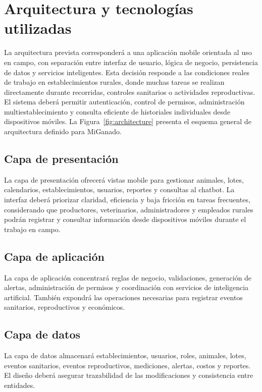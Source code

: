 \section{Arquitectura y tecnolog\'ias utilizadas}

La arquitectura prevista corresponder\'a a una aplicaci\'on mobile orientada al uso en campo, con separaci\'on entre interfaz de usuario, l\'ogica de negocio, persistencia de datos y servicios inteligentes. Esta decisi\'on responde a las condiciones reales de trabajo en establecimientos rurales, donde muchas tareas se realizan directamente durante recorridas, controles sanitarios o actividades reproductivas. El sistema deber\'a permitir autenticaci\'on, control de permisos, administraci\'on multiestablecimiento y consulta eficiente de historiales individuales desde dispositivos m\'oviles. La Figura~\ref{fig:architecture} presenta el esquema general de arquitectura definido para MiGanado.

\subsection{Capa de presentaci\'on}

La capa de presentaci\'on ofrecer\'a vistas mobile para gestionar animales, lotes, calendarios, establecimientos, usuarios, reportes y consultas al chatbot. La interfaz deber\'a priorizar claridad, eficiencia y baja fricci\'on en tareas frecuentes, considerando que productores, veterinarios, administradores y empleados rurales podr\'an registrar y consultar informaci\'on desde dispositivos m\'oviles durante el trabajo en campo.

\subsection{Capa de aplicaci\'on}

La capa de aplicaci\'on concentrar\'a reglas de negocio, validaciones, generaci\'on de alertas, administraci\'on de permisos y coordinaci\'on con servicios de inteligencia artificial. Tambi\'en expondr\'a las operaciones necesarias para registrar eventos sanitarios, reproductivos y econ\'omicos.

\subsection{Capa de datos}

La capa de datos almacenar\'a establecimientos, usuarios, roles, animales, lotes, eventos sanitarios, eventos reproductivos, mediciones, alertas, costos y reportes. El dise\~no deber\'a asegurar trazabilidad de las modificaciones y consistencia entre entidades.

